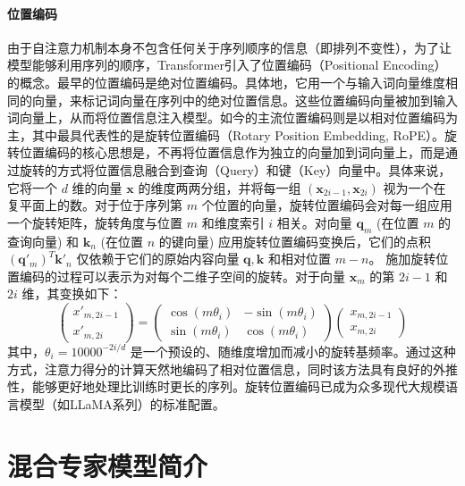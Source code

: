 \paragraph{位置编码}
由于自注意力机制本身不包含任何关于序列顺序的信息（即排列不变性），为了让模型能够利用序列的顺序，Transformer引入了位置编码（Positional Encoding）的概念。最早的位置编码是绝对位置编码。具体地，它用一个与输入词向量维度相同的向量，来标记词向量在序列中的绝对位置信息。这些位置编码向量被加到输入词向量上\cite{Vaswani2017AttentionIA}，从而将位置信息注入模型。如今的主流位置编码则是以相对位置编码为主，其中最具代表性的是旋转位置编码（Rotary Position Embedding, RoPE）\cite{Su2021RoFormerET}。旋转位置编码的核心思想是，不再将位置信息作为独立的向量加到词向量上，而是通过旋转的方式将位置信息融合到查询（Query）和键（Key）向量中。具体来说，它将一个 $d$ 维的向量 $\mathbf{x}$ 的维度两两分组，并将每一组 $(\boldsymbol{x}_{2i-1}, \boldsymbol{x}_{2i})$ 视为一个在复平面上的数。对于位于序列第 $m$ 个位置的向量，旋转位置编码会对每一组应用一个旋转矩阵，旋转角度与位置 $m$ 和维度索引 $i$ 相关。对向量 $\mathbf{q}_m$ (在位置 $m$ 的查询向量) 和 $\mathbf{k}_n$ (在位置 $n$ 的键向量) 应用旋转位置编码变换后，它们的点积 $(\mathbf{q}'_m)^T \mathbf{k}'_n$ 仅依赖于它们的原始内容向量 $\mathbf{q}, \mathbf{k}$ 和相对位置 $m-n$。
施加旋转位置编码的过程可以表示为对每个二维子空间的旋转。对于向量 $\mathbf{x}_m$ 的第 $2i-1$ 和 $2i$ 维，其变换如下：
\begin{equation}
\begin{pmatrix} x'_{m, 2i-1} \\ x'_{m, 2i} \end{pmatrix} = \begin{pmatrix} \cos(m\theta_i) & -\sin(m\theta_i) \\ \sin(m\theta_i) & \cos(m\theta_i) \end{pmatrix} \begin{pmatrix} x_{m, 2i-1} \\ x_{m, 2i} \end{pmatrix}
\end{equation}
其中，$\theta_i = 10000^{-2i/d}$ 是一个预设的、随维度增加而减小的旋转基频率。通过这种方式，注意力得分的计算天然地编码了相对位置信息，同时该方法具有良好的外推性，能够更好地处理比训练时更长的序列。旋转位置编码已成为众多现代大规模语言模型（如LLaMA系列）的标准配置。


\section{混合专家模型简介}

